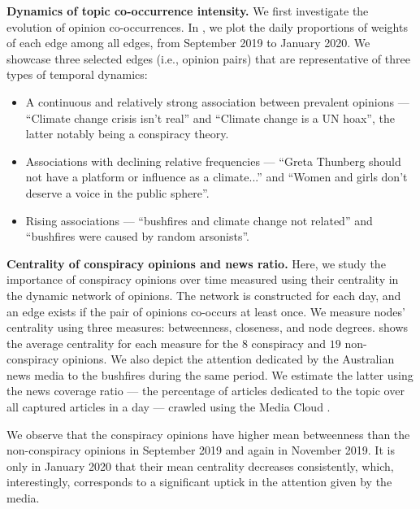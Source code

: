 \textbf{Dynamics of topic co-occurrence intensity.}
We first investigate the evolution of opinion co-occurrences. 
In , we plot the daily proportions of weights of each edge among all edges, from September 2019 to January 2020. 
We showcase three selected edges (i.e., opinion pairs) that are representative of three types of temporal dynamics:
\begin{itemize}
    \item A continuous and relatively strong association between prevalent opinions --- ``Climate change crisis isn't real'' and ``Climate change is a UN hoax'', the latter notably being a conspiracy theory. 
    \item Associations with declining relative frequencies --- ``Greta Thunberg should not have a platform or influence as a climate...'' and ``Women and girls don't deserve a voice in the public sphere''.
    \item Rising associations --- ``bushfires and climate change not related'' and ``bushfires were caused by random arsonists''.
\end{itemize}

\textbf{Centrality of conspiracy opinions and news ratio.}
Here, we study the importance of conspiracy opinions over time measured using their centrality in the dynamic network of opinions.
The network is constructed for each day, and an edge exists if the pair of opinions co-occurs at least once.
We measure nodes' centrality using three measures: betweenness, closeness, and node degrees.
 shows the average centrality for each measure for the $8$ conspiracy and $19$ non-conspiracy opinions.
We also depict the attention dedicated by the Australian news media to the bushfires during the same period. 
We estimate the latter using the news coverage ratio --- the percentage of articles dedicated to the topic over all captured articles in a day ---
crawled using the Media Cloud \citep{roberts2021media}. 

We observe that the conspiracy opinions have higher mean betweenness than the non-conspiracy opinions in September 2019 and again in November 2019.
It is only in January 2020 that their mean centrality decreases consistently, which, interestingly, corresponds to a significant uptick in the attention given by the media.


